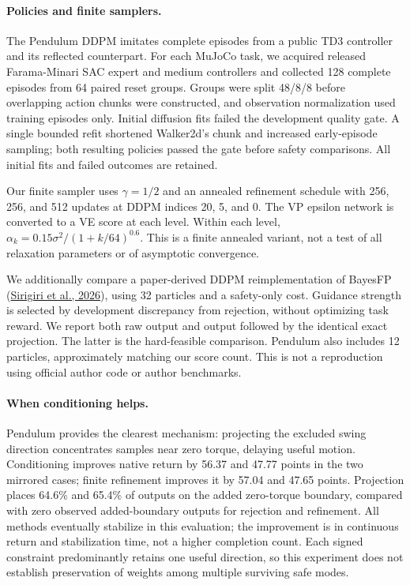 \paragraph{Policies and finite samplers.}
The Pendulum DDPM imitates complete episodes from a public TD3 controller and
its reflected counterpart. For each MuJoCo task, we acquired released
Farama-Minari SAC expert and medium controllers and collected 128 complete
episodes from 64 paired reset groups. Groups were split 48/8/8 before
overlapping action chunks were constructed, and observation normalization used
training episodes only. Initial diffusion fits failed the development quality
gate. A single bounded refit shortened Walker2d's chunk and increased
early-episode sampling; both resulting policies passed the gate before safety
comparisons. All initial fits and failed outcomes are retained.

Our finite sampler uses $\gamma=1/2$ and an annealed refinement schedule with
256, 256, and 512 updates at DDPM indices 20, 5, and 0. The VP epsilon network
is converted to a VE score at each level. Within each level,
$\alpha_k=0.15\sigma^2/(1+k/64)^{0.6}$. This is a finite annealed variant,
not a test of all relaxation parameters or of asymptotic convergence.

We additionally compare a paper-derived DDPM reimplementation of BayesFP
(\href{https://arxiv.org/abs/2606.21014}{Sirigiri et al., 2026}), using 32 particles and a safety-only
cost. Guidance strength is selected by development discrepancy from rejection,
without optimizing task reward. We report both raw output and output followed
by the identical exact projection. The latter is the hard-feasible comparison.
Pendulum also includes 12 particles, approximately matching our score count.
This is not a reproduction using official author code or author benchmarks.



\paragraph{When conditioning helps.}
Pendulum provides the clearest mechanism: projecting the excluded swing
direction concentrates samples near zero torque, delaying useful motion.
Conditioning improves native return by 56.37 and 47.77 points in the two
mirrored cases; finite refinement improves it by 57.04 and 47.65 points.
Projection places 64.6\% and 65.4\% of outputs on the added zero-torque
boundary, compared with zero observed added-boundary outputs for rejection
and refinement. All methods eventually stabilize in this evaluation; the
improvement is in continuous return and stabilization time, not a higher
completion count. Each signed constraint predominantly retains one useful
direction, so this experiment does not establish preservation of weights among
multiple surviving safe modes.

